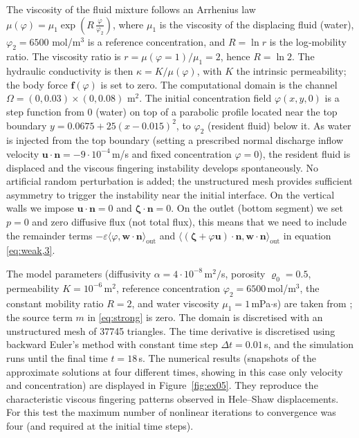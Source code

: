 \documentclass[11pt, reqno, a4paper, twoside]{article}
\newcommand{\bn}{\boldsymbol{n}}
\newcommand{\bu}{\boldsymbol{u}}
\newcommand{\bw}{\boldsymbol{w}}
\renewcommand{\bf}{\boldsymbol{f}}
\newcommand\bzeta{\boldsymbol{\zeta}}
\numberwithin{equation}{section}
\numberwithin{remark}{section}
\numberwithin{figure}{section}
\numberwithin{table}{section}
\begin{document}
The viscosity of the fluid mixture follows an Arrhenius law 
$\mu(\varphi) = \mu_1 \exp(R\,\frac{\varphi}{\varphi_2})$, 
where \(\mu_1\) is the viscosity of the displacing fluid (water), \(\varphi_2 = 6500\) mol/m\(^3\) is a reference concentration, and \(R = \ln r\) is the log‑mobility ratio. 
The viscosity ratio is \(r = \mu(\varphi=1)/\mu_1 = 2\), hence \(R = \ln 2\). 
The hydraulic conductivity is then \(\kappa = K/\mu(\varphi)\), with \(K\) the intrinsic permeability; the  body force \(\bf(\varphi)\) is set to zero. The computational domain is the channel \(\Omega = (0,0.03)\times(0,0.08)\) m\(^2\). 
The initial concentration field $\varphi(x,y,0)$ is a step function from 0 (water) on top of a parabolic profile located near the top boundary $y=0.0675+25(x-0.015)^2$, to $\varphi_2$ (resident fluid) below it. 
As water is injected from the top  boundary (setting a prescribed normal discharge inflow velocity $\bu\cdot\bn = -9\cdot10^{-4}$\,m/s and fixed concentration $\varphi = 0$), the resident fluid is displaced and the viscous fingering instability develops spontaneously. 
No artificial random perturbation is added; the unstructured mesh provides sufficient asymmetry to trigger the instability near the initial interface. On the vertical walls we impose \(\bu\cdot\bn = 0\) and \(\bzeta\cdot\bn = 0\). On the outlet (bottom segment) we set $p=0$ and zero diffusive flux (not total flux), this means that we need to include the remainder terms $-\varepsilon \langle \varphi, \bw\cdot \bn \rangle_{\mathrm{out}}$ and $\langle (\bzeta+\varphi\bu)\cdot \bn, \bw\cdot\bn\rangle_{\mathrm{out}}$ in equation \eqref{eq:weak,3}.  
    
The model parameters (diffusivity \(\alpha = 4\cdot10^{-8}\)\,m$^2/$s, porosity \(\varrho_0=0.5\), permeability \(K=10^{-6}\)\,m$^2$, reference concentration \(\varphi_2=6500\)\,mol/m$^3$,  the constant mobility ratio  \(R=2\), and water viscosity $\mu_1=1$\,mPa$\cdot$s) are taken from \cite{bear2013dynamics,gatica2022p}; the source term \(m\) in \eqref{eq:strong} is zero. 
The domain is discretised with an unstructured mesh of 37745 triangles. 
The time derivative is discretised using backward Euler's method with constant time step \(\Delta t = 0.01\)\,s, and the simulation runs until the final time \(t = 18\)\,s. 
The numerical results (snapshots of the approximate solutions at four different times, showing in this case only velocity and concentration)  are displayed in Figure~\ref{fig:ex05}. They reproduce the characteristic viscous fingering patterns observed in Hele--Shaw displacements. For this test the maximum number of nonlinear iterations  to convergence was four (and required at the initial time steps).
\end{document}
